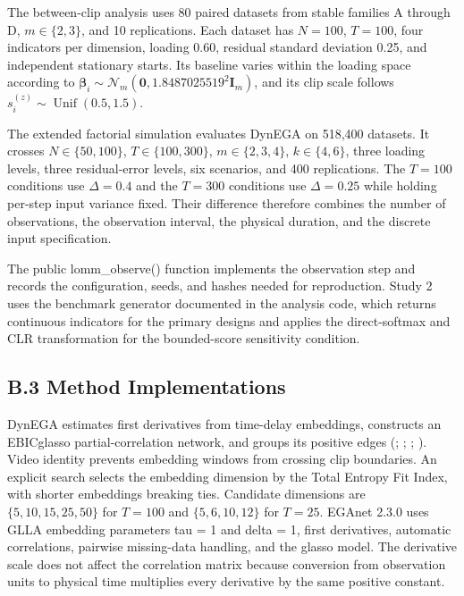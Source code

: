 \documentclass[
]{article}
\begin{document}
\begin{table}[H]
{}

\end{table}%

The between-clip analysis uses 80 paired datasets from stable families A
through D, \(m\in\{2,3\}\), and 10 replications. Each dataset has
\(N=100\), \(T=100\), four indicators per dimension, loading 0.60,
residual standard deviation 0.25, and independent stationary starts. Its
baseline varies within the loading space according to
\(\boldsymbol\beta_i\sim\mathcal N_m(\mathbf 0,1.8487025519^2\mathbf I_m)\),
and its clip scale follows
\(s_i^{(z)}\sim\operatorname{Unif}(0.5,1.5)\).

The extended factorial simulation evaluates DynEGA on 518,400 datasets.
It crosses \(N\in\{50,100\}\), \(T\in\{100,300\}\), \(m\in\{2,3,4\}\),
\(k\in\{4,6\}\), three loading levels, three residual-error levels, six
scenarios, and 400 replications. The \(T=100\) conditions use
\(\Delta=0.4\) and the \(T=300\) conditions use \(\Delta=0.25\) while
holding per-step input variance fixed. Their difference therefore
combines the number of observations, the observation interval, the
physical duration, and the discrete input specification.

The public lomm\_observe() function implements the observation step and
records the configuration, seeds, and hashes needed for reproduction.
Study 2 uses the benchmark generator documented in the analysis code,
which returns continuous indicators for the primary designs and applies
the direct-softmax and CLR transformation for the bounded-score
sensitivity condition.

\subsection{B.3 Method
Implementations}\label{b.3-method-implementations}

DynEGA estimates first derivatives from time-delay embeddings,
constructs an EBICglasso partial-correlation network, and groups its
positive edges (;
;
;
). Video
identity prevents embedding windows from crossing clip boundaries. An
explicit search selects the embedding dimension by the Total Entropy Fit
Index, with shorter embeddings breaking ties. Candidate dimensions are
\(\{5,10,15,25,50\}\) for \(T=100\) and \(\{5,6,10,12\}\) for \(T=25\).
EGAnet 2.3.0 uses GLLA embedding parameters tau = 1 and delta = 1, first
derivatives, automatic correlations, pairwise missing-data handling, and
the glasso model. The derivative scale does not affect the correlation
matrix because conversion from observation units to physical time
multiplies every derivative by the same positive constant.
\end{document}
